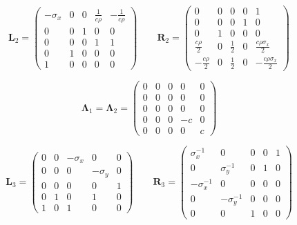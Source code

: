 \begin{equation*}
    \pmb{L}_2 = \begin{pmatrix}
        -\sigma_x & 0 & 0 & \frac{1}{c \rho} & -\frac{1}{c \rho} \\
        0 & 0 & 1 & 0 & 0 \\
        0 & 0 & 0 & 1 & 1 \\
        0 & 1 & 0 & 0 & 0 \\
        1 & 0 & 0 & 0 & 0
    \end{pmatrix} \qquad
    \pmb{R}_2 = \begin{pmatrix}
        0 & 0 & 0 & 0 & 1 \\
        0 & 0 & 0 & 1 & 0 \\
        0 & 1 & 0 & 0 & 0 \\
        \frac{c \rho}{2} & 0 & \frac{1}{2} & 0 & \frac{c \rho \sigma_x}{2}  \\
        -\frac{c \rho}{2} & 0 & \frac{1}{2} & 0 & - \frac{c \rho \sigma_x}{2} 
    \end{pmatrix}
\end{equation*}

\begin{equation*}
    \pmb{\Lambda}_1 = \pmb{\Lambda}_2 = \begin{pmatrix}
        0 & 0 & 0 & 0 & 0 \\
        0 & 0 & 0 & 0 & 0 \\
        0 & 0 & 0 & 0 & 0 \\
        0 & 0 & 0 & -c & 0 \\
        0 & 0 & 0 & 0 & c
    \end{pmatrix} 
\end{equation*}
    

\begin{equation*}
    \pmb{L}_3 = \begin{pmatrix}
        0 & 0 & -\sigma_x & 0 & 0 \\
        0 & 0 & 0 & -\sigma_y & 0 \\
        0 & 0 & 0 & 0 & 1 \\
        0 & 1 & 0 & 1 & 0 \\
        1 & 0 & 1 & 0 & 0
    \end{pmatrix} \qquad
    \pmb{R}_3 = \begin{pmatrix}
        \sigma_x^{-1} & 0 & 0 & 0 & 1 \\
        0 & \sigma_y^{-1} & 0 & 1 & 0 \\
        -\sigma_x^{-1} & 0 & 0 & 0 & 0 \\
        0 & -\sigma_y^{-1} & 0 & 0 & 0 \\
        0 & 0 & 1 & 0 & 0
    \end{pmatrix}
\end{equation*}

